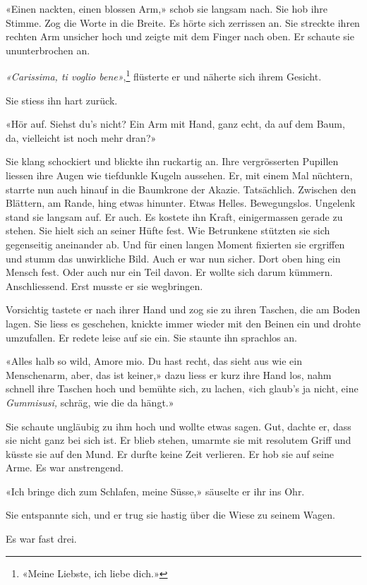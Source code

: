 «Einen nackten, einen blossen Arm,» schob sie langsam nach.
Sie hob ihre Stimme. Zog die Worte in die Breite. Es hörte sich
zerrissen an. Sie streckte ihren rechten Arm unsicher hoch und zeigte
mit dem Finger nach oben.
Er schaute sie ununterbrochen an.

\emph{«Carissima, ti voglio bene»},\footnote{«Meine Liebste, ich liebe dich.»} flüsterte er und näherte sich ihrem
Gesicht.

Sie stiess ihn hart zurück.

«Hör auf. Siehst du’s nicht? Ein Arm mit Hand, ganz echt, da auf dem
Baum, da, vielleicht ist noch mehr dran?»

Sie klang schockiert und blickte ihn ruckartig an. Ihre vergrösserten
Pupillen liessen ihre Augen wie tiefdunkle Kugeln aussehen.
Er, mit einem Mal nüchtern, starrte nun auch hinauf in die Baumkrone der
Akazie. Tatsächlich.
Zwischen den Blättern, am Rande, hing etwas hinunter. Etwas Helles.
Bewegungslos. 
Ungelenk stand sie langsam auf. Er auch.
Es kostete ihn Kraft, einigermassen gerade zu stehen. Sie hielt sich an
seiner Hüfte fest. Wie Betrunkene stützten sie sich gegenseitig
aneinander ab. Und für einen langen Moment fixierten sie ergriffen und stumm das unwirkliche Bild.
Auch er war nun sicher. Dort oben hing ein Mensch fest. Oder auch nur
ein Teil davon. Er wollte sich darum kümmern. Anschliessend.
Erst musste er sie wegbringen. 

Vorsichtig tastete er nach ihrer Hand und zog sie zu ihren Taschen, die am
Boden lagen. Sie liess es geschehen, knickte immer wieder mit den Beinen ein
und drohte umzufallen.
Er redete leise auf sie ein. Sie staunte ihn sprachlos an.

«Alles halb so wild, Amore mio. Du hast recht, das sieht aus wie ein
Menschenarm, aber, das ist keiner,» dazu liess er kurz ihre Hand los,
nahm schnell ihre Taschen hoch und bemühte sich, zu lachen, «ich glaub’s
ja nicht, eine \emph{Gummisusi,} schräg, wie die da hängt.»

Sie schaute ungläubig zu ihm hoch und wollte etwas sagen. Gut, dachte
er, dass sie nicht ganz bei sich ist. Er blieb stehen, umarmte sie mit
resolutem Griff und küsste sie auf den Mund.
Er durfte keine Zeit verlieren. Er hob sie auf seine Arme. Es war anstrengend.
 
«Ich bringe dich zum Schlafen, meine Süsse,» säuselte er ihr ins Ohr.

Sie entspannte sich, und er trug sie hastig über die
Wiese zu seinem Wagen.

Es war fast drei.
